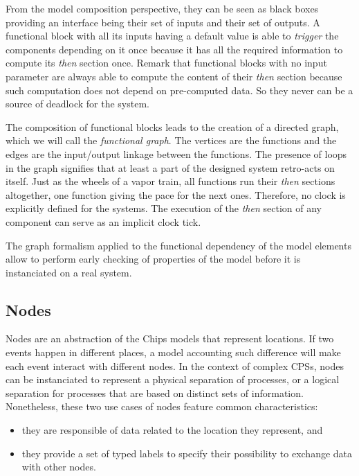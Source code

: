 \documentclass[runningheads]{llncs}
\begin{document}
From the model composition perspective, they can be seen as black boxes providing an interface being their set of inputs and their set of outputs. A functional block with all its inputs having a default value is able to \emph{trigger} the components depending on it once because it has all the required information to compute its \emph{then} section once. Remark that functional blocks with no input parameter are always able to compute the content of their \emph{then} section because such computation does not depend on pre-computed data. So they never can be a source of deadlock for the system. 

The composition of functional blocks leads to the creation of a directed graph, which we will call the \emph{functional graph}. The vertices are the functions and the edges are the input/output linkage between the functions. The presence of loops in the graph signifies that at least a part of the designed system retro-acts on itself. Just as the wheels of a vapor train, all functions run their \emph{then} sections altogether, one function giving the pace for the next ones. Therefore, no clock is explicitly defined for the systems. The execution of the \emph{then} section of any component can serve as an implicit clock tick.

The graph formalism applied to the functional dependency of the model elements allow to perform early checking of properties of the model before it is instanciated on a real system.

\subsection{Nodes}

Nodes are an abstraction of the Chips models that represent locations. If two events happen in different places, a model accounting such difference will make each event interact with different nodes. In the context of complex CPSs, nodes can be instanciated to represent a physical separation of processes, or a logical separation for processes that are based on distinct sets of information. Nonetheless, these two use cases of nodes feature common characteristics:
\begin{itemize}
    \item they are responsible of data related to the location they represent, and
    \item they provide a set of typed labels to specify their possibility to exchange data with other nodes.
\end{itemize}
\end{document}
